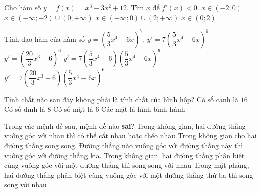\begin{ex}%
    Cho hàm số $y = f(x) = x^3 - 3x^2 + 12$. Tìm $x$ để $f'(x) < 0$.
    \choice
    {$x \in (-2;0)$}
    {$x \in (- \infty;-2) \cup (0; + \infty)$}
    {$x \in (- \infty;0) \cup (2; + \infty)$}
    {\True $x \in (0;2)$}
\end{ex}

\begin{ex}%
    Tính đạo hàm của hàm số $y = \left( \dfrac{5}{3} x^4 - 6x \right)^7$.
    \choice
    {$y' = 7 \left( \dfrac{5}{3} x^4 - 6x \right)^6$}
    {$y' = \left( \dfrac{20}{3} x^3 - 6 \right)^6$}
    {$y' = 7 \left( \dfrac{5}{3} x^4 - 6 \right) \left( \dfrac{5}{3} x^4 - 6x \right)^6$}
    {\True $y' = 7 \left( \dfrac{20}{3} x^3 - 6 \right) \left( \dfrac{5}{3} x^4 - 6x \right)^6$}
\end{ex}

\begin{ex}%
    Tính chất nào sau đây không phải là tính chất của hình hộp?
    \choice
    {\True Có số cạnh là $16$}
    {Có số đỉnh là $8$}
    {Có số mặt là $6$}
    {Các mặt là hình bình hành}
\end{ex}

\begin{ex}%
    Trong các mệnh đề sau, mệnh đề nào {\bf sai}?
    \choice
    {Trong không gian, hai đường thẳng vuông góc với nhau thì có thể cắt nhau hoặc chéo nhau}
    {Trong không gian cho hai đường thẳng song song. Đường thẳng nào vuông góc với đường thẳng này thì vuông góc với đường thẳng kia.}
    {\True Trong không gian, hai đường thẳng phân biệt cùng vuông góc với một đường thẳng thì song song với nhau}
    {Trong mặt phẳng, hai đường thẳng phân biệt cùng vuông góc với một đường thẳng thứ ba thì song song với nhau}
\end{ex}

